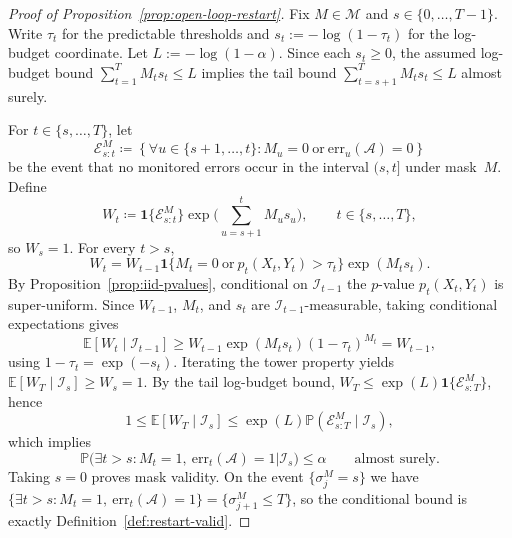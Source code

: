 \documentclass{uai2026} %
\newcommand{\1}{\mathbf{1}}
\newcommand{\ind}[1]{\mathbf{1}\{#1\}}
\newcommand{\prob}{\mathbb{P}}
\newcommand{\expec}{\mathbb{E}}
\newcommand{\err}{\mathrm{err}}
\newcommand{\mcal}{\mathcal{M}}
\newcommand{\acal}{\mathcal{A}}
\begin{document}
\begin{proof}[Proof of Proposition~\ref{prop:open-loop-restart}]
  Fix $M\in\mcal$ and $s\in\{0,\dots,T-1\}$.
  Write $\tau_t$ for the predictable thresholds and $s_t := -\log(1-\tau_t)$ for the log-budget coordinate.
  Let $L := -\log(1-\alpha)$.
  Since each $s_t \ge 0$, the assumed log-budget bound $\sum_{t=1}^{T} M_t s_t \le L$ implies the tail bound $\sum_{t=s+1}^{T} M_t s_t \le L$ almost surely.

  For $t\in\{s,\dots,T\}$, let
  \begin{equation*}
    \mathcal{E}_{s:t}^{M}
    \coloneqq
    \left\{\forall u\in\{s+1,\dots,t\}\colon M_u=0\ \text{or}\ \err_u(\acal)=0\right\}
  \end{equation*}
  be the event that no monitored errors occur in the interval $(s,t]$ under mask~$M$.
  Define
  \begin{equation*}
    W_t \coloneqq \ind{\mathcal{E}_{s:t}^{M}} \exp\Big(\sum_{u=s+1}^{t} M_u s_u\Big),
    \qquad t\in\{s,\dots,T\},
  \end{equation*}
  so $W_s=1$. For every $t>s$,
  \begin{equation*}
    W_t = W_{t-1}\ind{M_t=0\ \text{or}\ p_t(X_t,Y_t)>\tau_t}\exp(M_t s_t).
  \end{equation*}
  By Proposition~\ref{prop:iid-pvalues}, conditional on $\mathcal{I}_{t-1}$ the $p$-value $p_t(X_t,Y_t)$ is super-uniform.
  Since $W_{t-1}$, $M_t$, and $s_t$ are $\mathcal{I}_{t-1}$-measurable, taking conditional expectations gives
  \begin{equation*}
    \expec[W_t \mid \mathcal{I}_{t-1}]
    \ge W_{t-1}\exp(M_t s_t)(1-\tau_t)^{M_t}
    = W_{t-1},
  \end{equation*}
  using $1-\tau_t=\exp(-s_t)$.
  Iterating the tower property yields $\expec[W_T \mid \mathcal{I}_s]\ge W_s=1$.
  By the tail log-budget bound, $W_T \le \exp(L)\ind{\mathcal{E}_{s:T}^{M}}$, hence
  \begin{equation*}
    1 \le \expec[W_T \mid \mathcal{I}_s] \le \exp(L)\prob(\mathcal{E}_{s:T}^{M}\mid \mathcal{I}_s),
  \end{equation*}
  which implies
  \begin{equation*}
    \prob\Big(\exists t>s\colon M_t=1,\ \err_t(\acal)=1 \Big| \mathcal{I}_s\Big)\le \alpha
    \qquad \text{almost surely.}
  \end{equation*}
  Taking $s=0$ proves mask validity.
  On the event $\{\sigma_j^{M}=s\}$ we have $\{\exists t>s\colon M_t=1,\ \err_t(\acal)=1\}=\{\sigma_{j+1}^{M}\le T\}$, so the conditional bound is exactly Definition~\ref{def:restart-valid}.
\end{proof}\par\medskip
\end{document}
